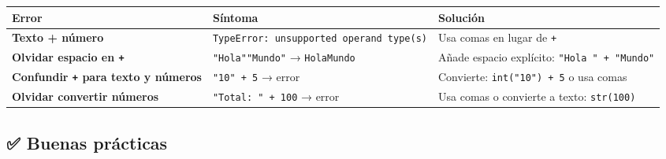 \documentclass[
  doc,
  floatsintext,
  longtable,
  a4paper,
  nolmodern,
  notxfonts,
  notimes,
  12pt,
  colorlinks=true,linkcolor=blue,citecolor=blue,urlcolor=blue]{apa7}
\newcounter{none} %
\begin{document}
{\def\LTcaptype{none} %
\begin{longtable}[]{@{}
  >{\raggedright\arraybackslash}p{}
  >{\raggedright\arraybackslash}p{}
  >{\raggedright\arraybackslash}p{}@{}}
\toprule\noalign{}
\begin{minipage}[b]{\linewidth}\raggedright
Error
\end{minipage} & \begin{minipage}[b]{\linewidth}\raggedright
Síntoma
\end{minipage} & \begin{minipage}[b]{\linewidth}\raggedright
Solución
\end{minipage} \\
\midrule\noalign{}
\endhead
\bottomrule\noalign{}
\endlastfoot
\textbf{Texto + número} &
\texttt{TypeError:\ unsupported\ operand\ type(s)} & Usa comas en lugar
de \texttt{+} \\
\textbf{Olvidar espacio en \texttt{+}} & \texttt{"Hola""Mundo"} →
\texttt{HolaMundo} & Añade espacio explícito:
\texttt{"Hola\ "\ +\ "Mundo"} \\
\textbf{Confundir \texttt{+} para texto y números} & \texttt{"10"\ +\ 5}
→ error & Convierte: \texttt{int("10")\ +\ 5} o usa comas \\
\textbf{Olvidar convertir números} & \texttt{"Total:\ "\ +\ 100} → error
& Usa comas o convierte a texto: \texttt{str(100)} \\
\end{longtable}
}

\subsection{✅ Buenas prácticas}\label{buenas-pruxe1cticas}
\end{document}
